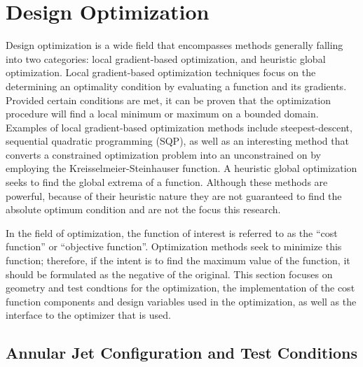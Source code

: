 \chapter{Design Optimization}
\label{chapter-five}

Design optimization is a wide field that encompasses methods generally falling
into two categories: local gradient-based optimization, and heuristic global
optimization.  Local gradient-based optimization techniques focus on the
determining an optimality condition by evaluating a function and its gradients.
Provided certain conditions are met, it can be proven that the optimization
procedure will find a local minimum or maximum on a bounded domain.  Examples of
local gradient-based optimization methods include
steepest-descent\cite{fletcher1963rapidly}, sequential quadratic programming
(SQP)\cite{SNOPT-alg}, as well as an interesting method that converts a
constrained optimization problem into an unconstrained on by employing the
Kreisselmeier-Steinhauser function\cite{wrenn1989indirect}.  A heuristic global
optimization seeks to find the global extrema of a function.  Although these
methods are powerful, because of their heuristic nature they are not guaranteed
to find the absolute optimum condition and are not the focus this research.

In the field of optimization, the function of interest is referred to as the
``cost function'' or ``objective function''.  Optimization methods seek to
minimize this function; therefore, if the intent is to find the maximum value
of the function, it should be formulated as the negative of the original.  This
section focuses on geometry and test condtions for the optimization, the
implementation of the cost function components and design variables used in the
optimization, as well as the interface to the optimizer that is used.

\section{Annular Jet Configuration and Test Conditions}

